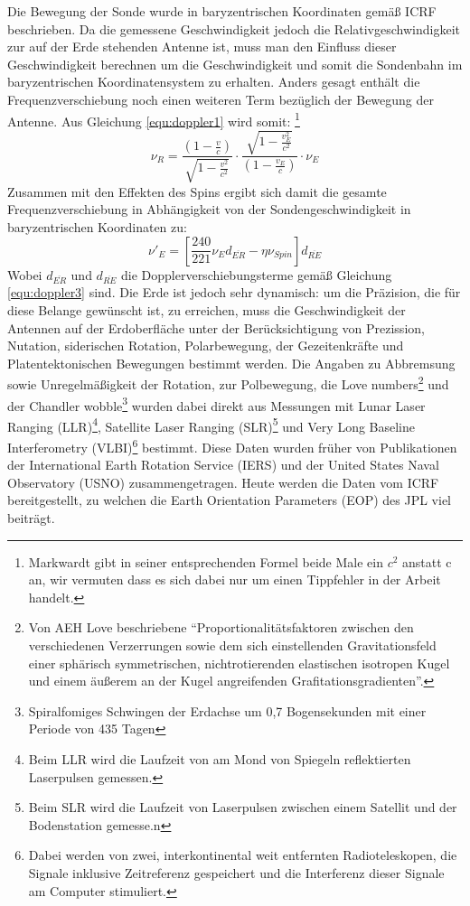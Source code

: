 Die Bewegung der Sonde wurde in baryzentrischen Koordinaten gemäß ICRF beschrieben. %
Da die gemessene Geschwindigkeit jedoch die Relativgeschwindigkeit zur auf der Erde stehenden Antenne ist,
muss man den Einfluss dieser Geschwindigkeit berechnen um die Geschwindigkeit und somit die Sondenbahn im baryzentrischen Koordinatensystem zu erhalten.
Anders gesagt enthält die Frequenzverschiebung noch einen weiteren Term bezüglich der Bewegung der Antenne. Aus Gleichung \ref{equ:doppler1} wird somit:
\footnote{Markwardt gibt in seiner entsprechenden Formel beide Male ein $c^2$ anstatt c an, wir vermuten dass es sich dabei nur um einen Tippfehler in der Arbeit handelt.}
\begin{equation}
\label{equ:doppler3}
 \nu_R = \frac{(1-\frac{v}{c})}{\sqrt{1-\frac{v^2}{c^2}}} \cdot \frac{\sqrt{1-\frac{v_E^2}{c^2}}}{(1-\frac{v_E}{c})} \cdot \nu_E 
\end{equation}
Zusammen mit den Effekten des Spins ergibt sich damit die gesamte Frequenzverschiebung in Abhängigkeit von der Sondengeschwindigkeit in baryzentrischen Koordinaten zu:
\begin{equation}
 \nu'_E = \left[ \frac{240}{221} \nu_E d_{\overline{ER}} - \eta \nu_{Spin} \right]  d_{\overline{RE}}
\end{equation}
Wobei $d_{\overline{ER}}$ und $d_{\overline{RE}}$ die Dopplerverschiebungsterme gemäß Gleichung \ref{equ:doppler3} sind.
Die Erde ist jedoch sehr dynamisch: um die Präzision, die für diese Belange gewünscht ist, zu erreichen, muss die Geschwindigkeit der Antennen auf der Erdoberfläche unter der Berücksichtigung von Prezission, Nutation,
siderischen Rotation, Polarbewegung, der Gezeitenkräfte und Platentektonischen Bewegungen bestimmt werden.
Die Angaben zu Abbremsung sowie Unregelmäßigkeit der Rotation, zur Polbewegung, die Love numbers\footnote{Von AEH Love beschriebene ``Proportionalitätsfaktoren zwischen den verschiedenen Verzerrungen sowie dem sich einstellenden Gravitationsfeld einer sphärisch symmetrischen, nichtrotierenden elastischen isotropen Kugel und einem äußerem an der Kugel angreifenden Grafitationsgradienten''\cite{Dittus2006}.} und der Chandler wobble\footnote{Spiralfomiges Schwingen
der Erdachse um 0,7 Bogensekunden mit einer Periode von 435 Tagen} %
wurden dabei direkt aus Messungen mit Lunar Laser Ranging (LLR)\footnote{Beim LLR wird die Laufzeit von am Mond von Spiegeln reflektierten Laserpulsen gemessen.},
Satellite Laser Ranging (SLR)\footnote{Beim SLR wird die Laufzeit von Laserpulsen zwischen einem Satellit und der Bodenstation gemesse.n} und Very Long Baseline Interferometry
(VLBI)\footnote{Dabei werden von zwei, interkontinental weit entfernten Radioteleskopen, die Signale inklusive
Zeitreferenz gespeichert und die Interferenz dieser Signale am Computer stimuliert.} bestimmt.
Diese Daten wurden früher von Publikationen der International Earth Rotation Service (IERS) und der United States Naval Observatory (USNO) zusammengetragen. Heute werden die Daten vom ICRF bereitgestellt,
zu welchen die Earth Orientation Parameters (EOP) des JPL viel beiträgt\cite{Anderson2002}.

